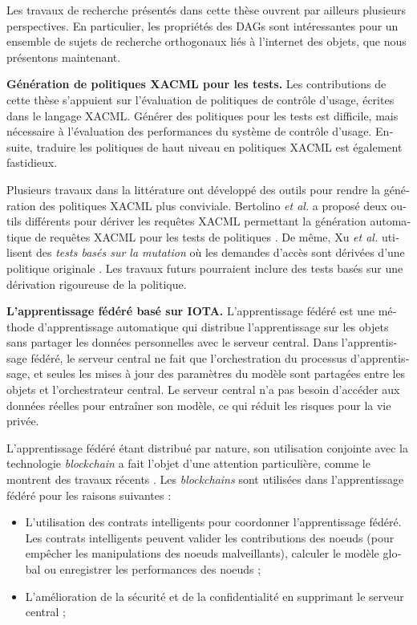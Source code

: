 \begin{otherlanguage}{french}
Les travaux de recherche présentés dans cette thèse ouvrent par ailleurs plusieurs perspectives. En particulier, les propriétés des DAGs sont intéressantes pour un ensemble de sujets de recherche orthogonaux liés à l'internet des objets, que nous présentons maintenant.

\textbf{Génération de politiques XACML pour les tests.} Les contributions de cette thèse s'appuient sur l'évaluation de politiques de contrôle d'usage, écrites dans le langage XACML.
Générer des politiques pour les tests est difficile, mais nécessaire à l'évaluation des performances du système de contrôle d'usage. 
Ensuite, traduire les politiques de haut niveau en politiques XACML est également fastidieux.
 
Plusieurs travaux dans la littérature ont développé des outils pour rendre la génération des politiques XACML plus conviviale. Bertolino \emph{et al.} a proposé deux outils différents pour dériver les requêtes XACML permettant la génération automatique de requêtes XACML pour les tests de politiques \cite{Bertolino2012}. 
De même, Xu \emph{et al.} utilisent des \emph{tests basés sur la mutation} où les demandes d'accès sont dérivées d'une politique originale \cite{Xu2020}. Les travaux futurs pourraient inclure des tests basés sur une dérivation rigoureuse de la politique.

 \textbf{L'apprentissage fédéré basé sur IOTA.} L'apprentissage fédéré est une méthode d'apprentissage automatique qui distribue l'apprentissage sur les objets sans partager les données personnelles avec le serveur central. Dans l'apprentissage fédéré, le serveur central ne fait que l'orchestration du processus d'apprentissage, et seules les mises à jour des paramètres du modèle sont partagées entre les objets et l'orchestrateur central. Le serveur central n'a pas besoin d'accéder aux données réelles pour entraîner son modèle, ce qui réduit les risques pour la vie privée.
 
 L'apprentissage fédéré étant distribué par nature, son utilisation conjointe avec la technologie \emph{blockchain} a fait l'objet d'une attention particulière, comme le montrent des travaux récents \cite{Dongkun2021, Lee2021, Issa2023, Qu2023, Qammar2023}. Les \emph{blockchains} sont utilisées dans l'apprentissage fédéré pour les raisons suivantes :
 \begin{itemize}
     \item L'utilisation des contrats intelligents pour coordonner l'apprentissage fédéré. Les contrats intelligents peuvent valider les contributions des noeuds (pour empêcher les manipulations des noeuds malveillants), calculer le modèle global ou enregistrer les performances des noeuds \cite{Issa2023};
     \item L'amélioration de la sécurité et de la confidentialité en supprimant le serveur central \cite{Issa2023};
 \end{itemize}
 

\end{otherlanguage}
